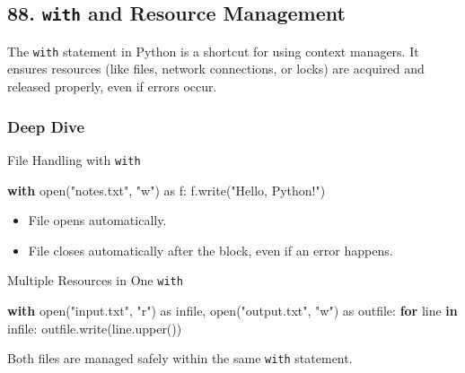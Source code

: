\documentclass[
  letterpaper,
  DIV=11,
  numbers=noendperiod]{scrreprt}
\newenvironment{Shaded}{\begin{snugshade}}{\end{snugshade}}
\newcommand{\BuiltInTok}[1]{\textcolor[rgb]{0.00,0.23,0.31}{#1}}
\newcommand{\ControlFlowTok}[1]{\textcolor[rgb]{0.00,0.23,0.31}{\textbf{#1}}}
\newcommand{\ImportTok}[1]{\textcolor[rgb]{0.00,0.46,0.62}{#1}}
\newcommand{\KeywordTok}[1]{\textcolor[rgb]{0.00,0.23,0.31}{\textbf{#1}}}
\newcommand{\NormalTok}[1]{\textcolor[rgb]{0.00,0.23,0.31}{#1}}
\newcommand{\StringTok}[1]{\textcolor[rgb]{0.13,0.47,0.30}{#1}}
\providecommand{\tightlist}{%
  \setlength{\itemsep}{0pt}\setlength{\parskip}{0pt}}
\begin{document}
\subsection{\texorpdfstring{88. \texttt{with} and Resource
Management}{88. with and Resource Management}}\label{with-and-resource-management}

The \texttt{with} statement in Python is a shortcut for using context
managers. It ensures resources (like files, network connections, or
locks) are acquired and released properly, even if errors occur.

\subsubsection{Deep Dive}\label{deep-dive-87}

File Handling with \texttt{with}

\begin{Shaded}
\begin{Highlighting}[]
\ControlFlowTok{with} \BuiltInTok{open}\NormalTok{(}\StringTok{"notes.txt"}\NormalTok{, }\StringTok{"w"}\NormalTok{) }\ImportTok{as}\NormalTok{ f:}
\NormalTok{    f.write(}\StringTok{"Hello, Python!"}\NormalTok{)}
\end{Highlighting}
\end{Shaded}

\begin{itemize}
\tightlist
\item
  File opens automatically.
\item
  File closes automatically after the block, even if an error happens.
\end{itemize}

Multiple Resources in One \texttt{with}

\begin{Shaded}
\begin{Highlighting}[]
\ControlFlowTok{with} \BuiltInTok{open}\NormalTok{(}\StringTok{"input.txt"}\NormalTok{, }\StringTok{"r"}\NormalTok{) }\ImportTok{as}\NormalTok{ infile, }\BuiltInTok{open}\NormalTok{(}\StringTok{"output.txt"}\NormalTok{, }\StringTok{"w"}\NormalTok{) }\ImportTok{as}\NormalTok{ outfile:}
    \ControlFlowTok{for}\NormalTok{ line }\KeywordTok{in}\NormalTok{ infile:}
\NormalTok{        outfile.write(line.upper())}
\end{Highlighting}
\end{Shaded}

Both files are managed safely within the same \texttt{with} statement.
\end{document}
